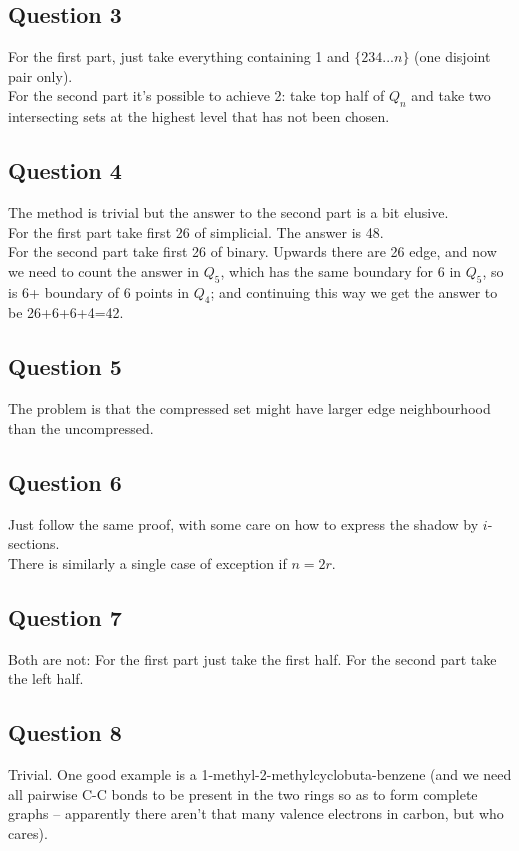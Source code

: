 \documentclass[a4paper]{article}
\begin{document}
\subsection{Question 3}
For the first part, just take everything containing 1 and $\{234...n\}$ (one disjoint pair only).\\
For the second part it's possible to achieve 2: take top half of $Q_n$ and take two intersecting sets at the highest level that has not been chosen.

\subsection{Question 4}
The method is trivial but the answer to the second part is a bit elusive.\\
For the first part take first 26 of simplicial. The answer is 48.\\
For the second part take first 26 of binary. Upwards there are 26 edge, and now we need to count the answer in $Q_5$, which has the same boundary for $6$ in $Q_5$, so is $6$+ boundary of $6$ points in $Q_4$; and continuing this way we get the answer to be 26+6+6+4=42.

\subsection{Question 5}
The problem is that the compressed set might have larger edge neighbourhood than the uncompressed.

\subsection{Question 6}
Just follow the same proof, with some care on how to express the shadow by $i$-sections.\\
There is similarly a single case of exception if $n=2r$.

\subsection{Question 7}
Both are not: For the first part just take the first half. For the second part take the left half.

\subsection{Question 8}
Trivial. One good example is a 1-methyl-2-methylcyclobuta-benzene (and we need all pairwise C-C bonds to be present in the two rings so as to form complete graphs -- apparently there aren't that many valence electrons in carbon, but who cares).
\end{document}

